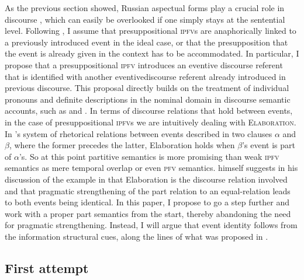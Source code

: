 \documentclass[output=paper]{langscibook}
\begin{document}
As the previous section showed, Russian aspectual forms play a crucial role in discourse \citep[see also][]{altshuler12}, which can easily be overlooked if one simply stays at the sentential level. Following \citet{gronndiss}, I assume that presuppositional \textsc{ipfv}s are anaphorically linked to a previously introduced event in the ideal case, or that the presupposition that the event is already given in the context has to be accommodated. %
In particular, I propose that a presuppositional \textsc{ipfv} introduces an eventive discourse referent that is identified with another eventive\linebreak discourse referent already introduced in previous discourse. This proposal directly builds on the treatment of individual pronouns and definite descriptions in the nominal domain in discourse semantic accounts, such as \citet{kampreyle} and \citet{lascaridesasher}. In terms of discourse relations that hold between events, in the case of presuppositional \textsc{ipfv}s we are intuitively dealing with \textsc{Elaboration}. In \citeauthor{lascaridesasher}'s system of rhetorical relations between events described in two clauses $\alpha$ and $\beta$, where the former precedes the latter, Elaboration holds when $\beta$'s event is part of $\alpha$'s. So at this point  partitive semantics is more promising than  weak \textsc{ipfv} semantics as mere temporal overlap or even  \textsc{pfv} semantics. \citeauthor{altshuler14} himself suggests in his discussion of the example in  \citep[(97) in][769]{altshuler14} that Elaboration is the discourse relation involved and that pragmatic strengthening of the part relation to an equal-relation leads to both events being identical. In this paper, I propose to go a step further and work with a proper part semantics from the start, thereby abandoning the need for pragmatic strengthening. Instead, I will argue that event identity follows from the information structural cues, along the lines of what was proposed in \citet{gronndiss}.

\subsection{First attempt}
\end{document}
